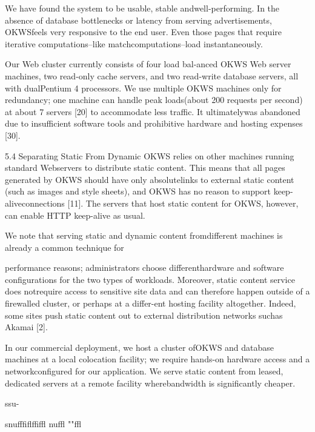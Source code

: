 We have found the system to be usable, stable andwell-performing. In the absence of database bottlenecks or latency from serving advertisements, OKWSfeels very responsive to the end user. Even those
pages that require iterative computations--like matchcomputations--load instantaneously.

Our Web cluster currently consists of four load bal-anced OKWS Web server machines, two read-only cache
servers, and two read-write database servers, all with dualPentium 4 processors. We use multiple OKWS machines
only for redundancy; one machine can handle peak loads(about 200 requests per second) at about 7%
servers [20] to accommodate less traffic. It ultimatelywas abandoned due to insufficient software tools and prohibitive hardware and hosting expenses [30].

5.4 Separating Static From Dynamic
OKWS relies on other machines running standard Webservers to distribute static content. This means that all
pages generated by OKWS should have only absolutelinks to external static content (such as images and style
sheets), and OKWS has no reason to support keep-aliveconnections [11]. The servers that host static content for
OKWS, however, can enable HTTP keep-alive as usual.

We note that serving static and dynamic content fromdifferent machines is already a common technique for

performance reasons; administrators choose differenthardware and software configurations for the two types
of workloads. Moreover, static content service does notrequire access to sensitive site data and can therefore happen outside of a firewalled cluster, or perhaps at a differ-ent hosting facility altogether. Indeed, some sites push
static content out to external distribution networks suchas Akamai [2].

In our commercial deployment, we host a cluster ofOKWS and database machines at a local colocation facility; we require hands-on hardware access and a networkconfigured for our application. We serve static content
from leased, dedicated servers at a remote facility wherebandwidth is significantly cheaper.

s\Gamma \Delta \Theta \Lambda \Gamma  \Theta su\Delta \Xi \Pi \Sigma \Delta \Xi \Gamma  -

s\Gamma \Delta \Upsilon \Phi \Psi  \Phi n\Omega ufffiflffiffl
\Upsilon \Phi \Gamma  n\Psi uffl
""ffl

